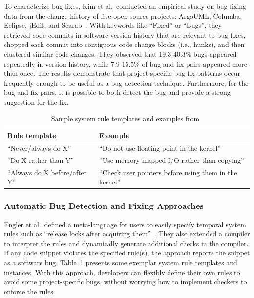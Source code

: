 \documentclass[runningheads,a4paper]{llncs}
\begin{document}
To characterize bug fixes, Kim et al.~conducted an empirical study on bug fixing data from the change history of five open source projects: ArgoUML, Columba, Eclipse, jEdit, and Scarab~\cite{Kim2006:MBF}. With keywords like ``Fixed'' or ``Bugs'', they retrieved code commits in software version history that are relevant to bug fixes, chopped each commit into contiguous code change blocks (i.e., hunks), and then clustered similar code changes. They observed that 19.3-40.3\% bugs appeared repeatedly in version history, while 7.9-15.5\% of bug-and-fix pairs appeared more than once. The results demonstrate that project-specific bug fix patterns occur frequently enough to be useful as a bug detection technique. Furthermore, for the bug-and-fix pairs, it is possible to both detect the bug and provide a strong suggestion for the fix. 

\begin{table}[]
\centering
\caption{Sample system rule templates and examples from~\cite{Engler2000:CSR}}
\label{tab:rule}
\begin{tabular}{l|l}
\toprule
Rule template                  & Example                                                 \\ \hline
``Never/always do X''          & ``Do not use floating point in the kernel''             \\\hline
``Do X rather than Y''         & ``Use memory mapped I/O rather than copying''           \\ \hline
``Always do X before/after Y'' & ``Check user pointers before using them in the kernel''\\
\bottomrule
\end{tabular}
\end{table} 

\subsubsection{Automatic Bug Detection and Fixing Approaches} 
Engler et al.~defined a meta-language for users to easily specify temporal system rules such as ``release locks after acquiring them''~\cite{Engler2000:CSR}. They also extended a compiler to interpret the rules and dynamically generate additional checks in the compiler. If any code snippet violates the specified rule(s), the approach reports the snippet as a software bug. Table~\ref{tab:rule} presents some exemplar system rule templates and instances. 
With this approach, developers can flexibly define their own rules to avoid some project-specific bugs, without worrying how to implement checkers to enforce the rules.
\end{document}
